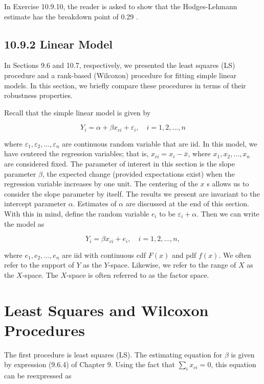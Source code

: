 In Exercise 10.9.10, the reader is asked to show that the Hodges-Lehmann estimate has the breakdown point of 0.29 .

\subsection*{10.9.2 Linear Model}
In Sections 9.6 and 10.7, respectively, we presented the least squares (LS) procedure and a rank-based (Wilcoxon) procedure for fitting simple linear models. In this section, we briefly compare these procedures in terms of their robustness properties.

Recall that the simple linear model is given by


\begin{equation*}
Y_{i}=\alpha+\beta x_{c i}+\varepsilon_{i}, \quad i=1,2, \ldots, n \tag{10.9.30}
\end{equation*}


where $\varepsilon_{1}, \varepsilon_{2}, \ldots, \varepsilon_{n}$ are continuous random variable that are iid. In this model, we have centered the regression variables; that is, $x_{c i}=x_{i}-\bar{x}$, where $x_{1}, x_{2}, \ldots, x_{n}$ are considered fixed. The parameter of interest in this section is the slope parameter $\beta$, the expected change (provided expectations exist) when the regression variable increases by one unit. The centering of the $x$ s allows us to consider the slope parameter by itself. The results we present are invariant to the intercept parameter $\alpha$. Estimates of $\alpha$ are discussed at the end of this section. With this in mind, define the random variable $e_{i}$ to be $\varepsilon_{i}+\alpha$. Then we can write the model as


\begin{equation*}
Y_{i}=\beta x_{c i}+e_{i}, \quad i=1,2, \ldots, n, \tag{10.9.31}
\end{equation*}


where $e_{1}, e_{2}, \ldots, e_{n}$ are iid with continuous cdf $F(x)$ and pdf $f(x)$. We often refer to the support of $Y$ as the $Y$-space. Likewise, we refer to the range of $X$ as the $X$-space. The $X$-space is often referred to as the factor space.

\section*{Least Squares and Wilcoxon Procedures}
The first procedure is least squares (LS). The estimating equation for $\beta$ is given by expression (9.6.4) of Chapter 9. Using the fact that $\sum_{i} x_{c i}=0$, this equation can be reexpressed as


